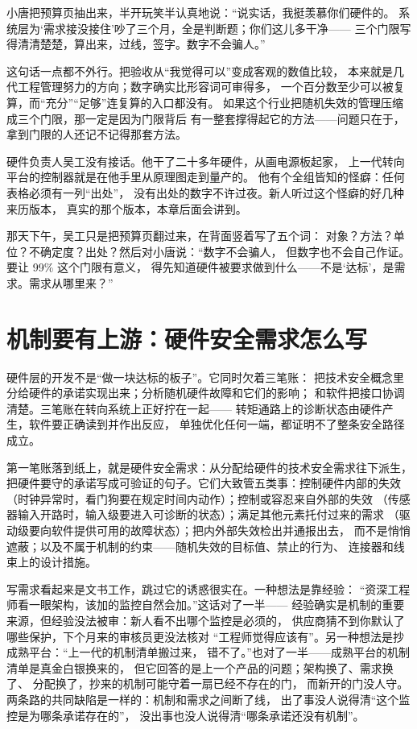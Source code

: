 小唐把预算页抽出来，半开玩笑半认真地说：“说实话，我挺羡慕你们硬件的。
系统层为‘需求接没接住’吵了三个月，全是判断题；你们这儿多干净——
三个门限写得清清楚楚，算出来，过线，签字。数字不会骗人。”

这句话一点都不外行。把验收从“我觉得可以”变成客观的数值比较，
本来就是几代工程管理努力的方向；数字确实比形容词可审得多，
一个百分数至少可以被复算，而“充分”“足够”连复算的入口都没有。
如果这个行业把随机失效的管理压缩成三个门限，那一定是因为门限背后
有一整套撑得起它的方法——问题只在于，拿到门限的人还记不记得那套方法。

硬件负责人吴工没有接话。他干了二十多年硬件，从画电源板起家，
上一代转向平台的控制器就是在他手里从原理图走到量产的。
他有个全组皆知的怪癖：任何表格必须有一列“出处”，
没有出处的数字不许过夜。新人听过这个怪癖的好几种来历版本，
真实的那个版本，本章后面会讲到。

那天下午，吴工只是把预算页翻过来，在背面竖着写了五个词：
对象？方法？单位？不确定度？出处？然后对小唐说：“数字不会骗人，
但数字也不会自己作证。要让 99\% 这个门限有意义，
得先知道硬件被要求做到什么——不是‘达标’，是需求。需求从哪里来？”

\section{机制要有上游：硬件安全需求怎么写}

硬件层的开发不是“做一块达标的板子”。它同时欠着三笔账：
把技术安全概念里分给硬件的承诺实现出来；分析随机硬件故障和它们的影响；
和软件把接口协调清楚。三笔账在转向系统上正好拧在一起——
转矩通路上的诊断状态由硬件产生，软件要正确读到并作出反应，
单独优化任何一端，都证明不了整条安全路径成立。

第一笔账落到纸上，就是硬件安全需求：从分配给硬件的技术安全需求往下派生，
把硬件要守的承诺写成可验证的句子。它们大致管五类事：控制硬件内部的失效
（时钟异常时，看门狗要在规定时间内动作）；控制或容忍来自外部的失效
（传感器输入开路时，输入级要进入可诊断的状态）；满足其他元素托付过来的需求
（驱动级要向软件提供可用的故障状态）；把内外部失效检出并通报出去，
而不是悄悄遮蔽；以及不属于机制的约束——随机失效的目标值、禁止的行为、
连接器和线束上的设计措施。

写需求看起来是文书工作，跳过它的诱惑很实在。一种想法是靠经验：
“资深工程师看一眼架构，该加的监控自然会加。”这话对了一半——
经验确实是机制的重要来源，但经验没法被审：新人看不出哪个监控是必须的，
供应商猜不到你默认了哪些保护，下个月来的审核员更没法核对
“工程师觉得应该有”。另一种想法是抄成熟平台：“上一代的机制清单搬过来，
错不了。”也对了一半——成熟平台的机制清单是真金白银换来的，
但它回答的是上一个产品的问题；架构换了、需求换了、
分配换了，抄来的机制可能守着一扇已经不存在的门，
而新开的门没人守。两条路的共同缺陷是一样的：机制和需求之间断了线，
出了事没人说得清“这个监控是为哪条承诺存在的”，
没出事也没人说得清“哪条承诺还没有机制”。

